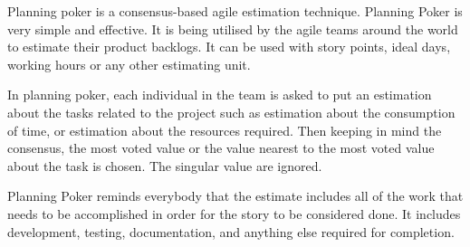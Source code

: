 Planning poker is a consensus-based agile estimation technique. 
Planning Poker is very simple and effective. It is being utilised by the agile teams around the world to estimate their product backlogs. It can be used with story points, ideal days, working hours or any other estimating unit.

In planning poker, each individual in the team is asked to put an estimation about the tasks related to the project such as estimation about the consumption of time, or estimation about the resources required. Then keeping in mind the consensus, the most voted value or the value nearest to the most voted value about the task is chosen. The singular value are ignored.

Planning Poker reminds everybody that the estimate includes all of the work that needs to be accomplished in order for the story to be considered done. It includes development, testing, documentation, and anything else required for completion.